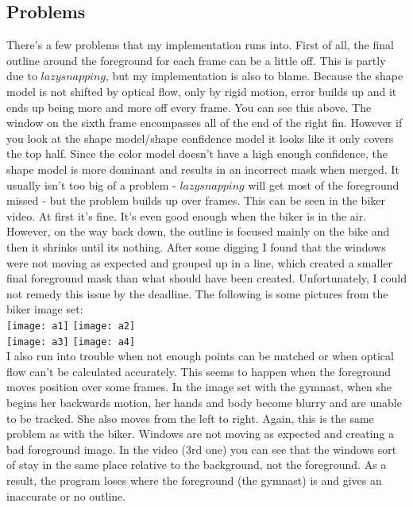 \documentclass[10pt]{article}
\begin{document}
\subsection{Problems}
There's a few problems that my implementation runs into. First of all, the final outline around the foreground for each frame can be a little off. This is partly due to $lazysnapping$, but my implementation is also to blame. Because the shape model is not shifted by optical flow, only by rigid motion, error builds up and it ends up being more and more off every frame. You can see this above. The window on the sixth frame encompasses all of the end of the right fin. However if you look at the shape model/shape confidence model it looks like it only covers the top half. Since the color model doesn't have a high enough confidence, the shape model is more dominant and results in an incorrect mask when merged. It usually isn't too big of a problem - $lazysnapping$ will get most of the foreground missed - but the problem builds up over frames. This can be seen in the biker video. At first it's fine. It's even good enough when the biker is in the air. However, on the way back down, the outline is focused mainly on the bike and then it shrinks until its nothing. After some digging I found that the windows were not moving as expected and grouped up in a line, which created a smaller final foreground mask than what should have been created. Unfortunately, I could not remedy this issue by the deadline. The following is some pictures from the biker image set:\\
\texttt{[image: a1]} 
\texttt{[image: a2]} \\
\texttt{[image: a3]} 
\texttt{[image: a4]} \\
I also run into trouble when not enough points can be matched or when optical flow can't be calculated accurately. This seems to happen when the foreground moves position over some frames. In the image set with the gymnast, when she begins her backwards motion, her hands and body become blurry and are unable to be tracked. She also moves from the left to right. Again, this is the same problem as with the biker. Windows are not moving as expected and creating a bad foreground image. In the video (3rd one) you can see that the windows sort of stay in the same place relative to the background, not the foreground. As a result, the program loses where the foreground (the gymnast) is and gives an inaccurate or no outline. \\
\end{document}
